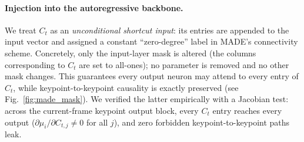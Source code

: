 \documentclass{article}
\begin{document}
\paragraph{Injection into the autoregressive backbone.}
We treat $C_t$ as an \emph{unconditional shortcut input}: its entries are
appended to the input vector and assigned a constant ``zero-degree'' label
in MADE's connectivity scheme. Concretely, only the input-layer mask is
altered (the columns corresponding to $C_t$ are set to all-ones); no
parameter is removed and no other mask changes. This guarantees every
output neuron may attend to every entry of $C_t$, while
keypoint-to-keypoint causality is exactly preserved
(see Fig.~\ref{fig:made_mask}). We verified the latter empirically with a
Jacobian test: across the current-frame keypoint output block, every $C_t$
entry reaches every output
($\partial \mu_i / \partial C_{t,j} \neq 0$ for all $j$), and zero
forbidden keypoint-to-keypoint paths leak.
\end{document}
